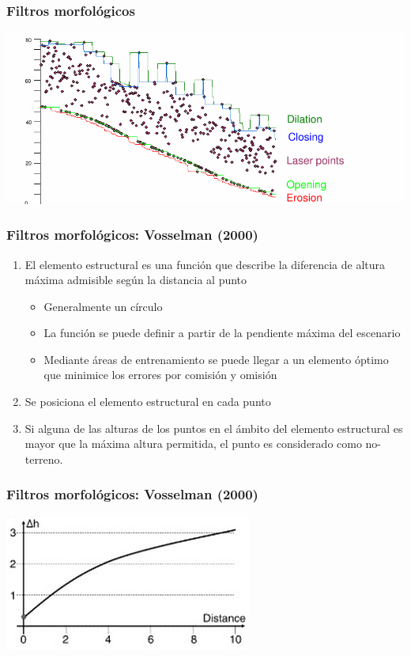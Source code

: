 \begin{frame}
  \frametitle{Filtros morfológicos}
  \begin{center}
    \includegraphics[height=0.70\textheight]{images/morfologia}
  \end{center}
\end{frame}
\begin{frame}
  \frametitle{Filtros morfológicos: Vosselman (2000)}
  \begin{enumerate}
    \item El elemento estructural es una función que describe la diferencia de
      altura máxima admisible según la distancia al punto
      \begin{itemize}
        \item Generalmente un círculo
        \item La función se puede definir a partir de la pendiente máxima del
          escenario
        \item Mediante áreas de entrenamiento se puede llegar a un elemento
          óptimo que minimice los errores por comisión y omisión
      \end{itemize}
    \item Se posiciona el elemento estructural en cada punto 
    \item Si alguna de las alturas de los puntos en el ámbito del elemento 
      estructural es mayor que la máxima altura permitida, el punto es 
      considerado como no-terreno.
  \end{enumerate}
\end{frame}
\begin{frame}
  \frametitle{Filtros morfológicos: Vosselman (2000)}
  \begin{center}
    \includegraphics[height=0.70\textheight]{images/morph_element}
  \end{center}
\end{frame}
